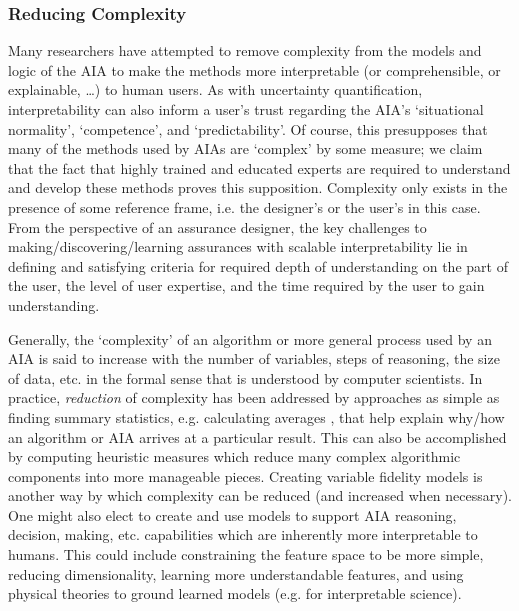         \subsubsection{Reducing Complexity} Many researchers have attempted to remove complexity from the models and logic of the AIA to make the methods more interpretable (or comprehensible, or explainable, \ldots) to human users. 
    As with uncertainty quantification, interpretability can also inform a user's trust regarding the AIA's `situational normality', `competence', and `predictability'. Of course, this presupposes that many of the methods used by AIAs are `complex' by some measure; we claim that the fact that highly trained and educated experts are required to understand and develop these methods %
    proves this supposition. Complexity only exists in the presence of some reference frame, i.e. the designer's or the user's in this case. 
    From the perspective of an assurance designer, the key challenges to making/discovering/learning assurances with scalable interpretability lie in defining and satisfying criteria for required depth of understanding on the part of the user, the level of user expertise, and the time required by the user to gain understanding. 

    Generally, the `complexity' of an algorithm or more general process used by an AIA is said to increase with the number of variables, steps of reasoning, the size of data, etc. in the formal sense that is understood by computer scientists. 
    In practice, \textit{reduction} of complexity has been addressed by approaches as simple as finding summary statistics, e.g. calculating averages \cite{Muir1994-ow,Muir1996-gt}, that help explain why/how an algorithm or AIA arrives at a particular result. 
    This can also be accomplished by computing heuristic measures which reduce many complex algorithmic components into more manageable pieces\cite{Aitken2016-cv}. Creating variable fidelity models is another way by which complexity can be reduced (and increased when necessary). One might also elect to create and use models to support AIA reasoning, decision, making, etc. capabilities which are inherently more interpretable to humans. This could include constraining the feature space to be more simple, reducing dimensionality, learning more understandable features, and using physical theories to ground learned models (e.g. for interpretable science).  %
        
